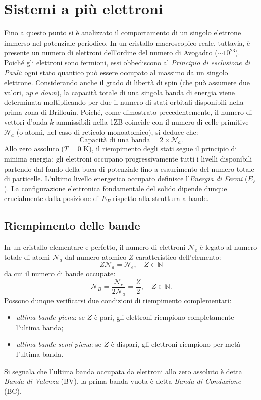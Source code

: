 \documentclass[a4paper,11pt]{report}
\begin{document}
\section{Sistemi a più elettroni}
Fino a questo punto si è analizzato il comportamento di un singolo elettrone immerso nel potenziale periodico. In un cristallo macroscopico reale, tuttavia, è presente un numero di elettroni dell'ordine del numero di Avogadro ($\sim 10^{23}$). Poiché gli elettroni sono fermioni, essi obbediscono al \textit{Principio di esclusione di Pauli}: ogni stato quantico può essere occupato al massimo da un singolo elettrone.
Considerando anche il grado di libertà di spin (che può assumere due valori, \textit{up} e \textit{down}), la capacità totale di una singola banda di energia viene determinata moltiplicando per due il numero di stati orbitali disponibili nella prima zona di Brillouin.
Poiché, come dimostrato precedentemente, il numero di vettori d'onda $k$ ammissibili nella 1ZB coincide con il numero di celle primitive $\mathcal{N}_a$ (o atomi, nel caso di reticolo monoatomico), si deduce che:
\begin{equation}
    \text{Capacità di una banda} = 2 \times \mathcal{N}_a.
\end{equation}
Allo zero assoluto ($T=0$ K), il riempimento degli stati segue il principio di minima energia: gli elettroni occupano progressivamente tutti i livelli disponibili partendo dal fondo della buca di potenziale fino a esaurimento del numero totale di particelle.
L'ultimo livello energetico occupato definisce l'\textit{Energia di Fermi} ($E_F$). La configurazione elettronica fondamentale del solido dipende dunque crucialmente dalla posizione di $E_F$ rispetto alla struttura a bande.

\subsection{Riempimento delle bande}
In un cristallo elementare e perfetto, il numero di elettroni $\mathcal{N}_e$ è legato al numero totale di atomi $\mathcal{N}_a$ dal numero atomico $Z$ caratteristico dell'elemento:
\begin{equation}
    Z\mathcal{N}_a = \mathcal{N}_e, \quad Z \in \mathbb{N}
\end{equation}
da cui il numero di bande occupate:
\begin{equation}
    \mathcal{N}_B = \frac{\mathcal{N}_e}{2\mathcal{N}_a} = \frac{Z}{2}, \quad Z \in \mathbb{N}.
\end{equation}
 Possono dunque verificarsi due condizioni di riempimento complementari:
\begin{itemize}
\item \textit{ultima bande piena}: se $Z$ è pari, gli elettroni riempiono completamente l'ultima banda;
\item \textit{ultima bande semi-piena}: se $Z$ è dispari, gli elettroni riempiono per metà l'ultima banda.
\end{itemize}
Si segnala che l'ultima banda occupata da elettroni allo zero assoluto è detta \textit{Banda di Valenza} (BV), la prima banda vuota è detta \textit{Banda di Conduzione} (BC).
\end{document}
